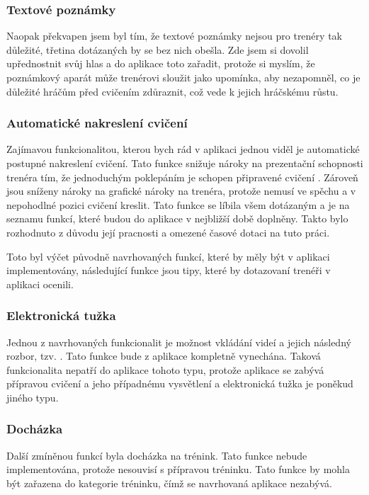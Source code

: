 \documentclass[thesis=B,czech]{FITthesis}[2012/06/26]
\begin{document}
\subsubsection{Textové poznámky}

	Naopak překvapen jsem byl tím, že textové poznámky nejsou pro trenéry tak důležité, třetina dotázaných by se bez nich obešla. Zde jsem si dovolil upřednostnit svůj hlas a do aplikace toto zařadit, protože si myslím, že poznámkový aparát může trenérovi sloužit jako upomínka, aby nezapomněl, co je důležité hráčům před cvičením zdůraznit, což vede k jejich hráčskému růstu.

\subsubsection{Automatické nakreslení cvičení}

	Zajímavou funkcionalitou, kterou bych rád v aplikaci jednou viděl je automatické postupné nakreslení cvičení. Tato funkce snižuje nároky na prezentační schopnosti trenéra tím, že jednoduchým poklepáním je schopen připravené cvičení . Zároveň jsou sníženy nároky na grafické nároky na trenéra, protože nemusí ve spěchu a v nepohodlné pozici cvičení kreslit. Tato funkce se líbila všem dotázaným a je na seznamu funkcí, které budou do aplikace v nejbližší době doplněny. Takto bylo rozhodnuto z důvodu její pracnosti a omezené časové dotaci na tuto práci.

	Toto byl výčet původně navrhovaných funkcí, které by měly být v aplikaci implementovány, následující funkce jsou tipy, které by dotazovaní trenéři v aplikaci ocenili.

\subsubsection{Elektronická tužka}

	Jednou z navrhovaných funkcionalit je možnost vkládání videí a jejich následný rozbor, tzv. . Tato funkce bude z aplikace kompletně vynechána. Taková funkcionalita nepatří do aplikace tohoto typu, protože aplikace se zabývá přípravou cvičení a jeho případnému vysvětlení a elektronická tužka je poněkud jiného typu.

\subsubsection{Docházka}

	Další zmíněnou funkcí byla docházka na trénink. Tato funkce nebude implementována, protože nesouvisí s přípravou tréninku. Tato funkce by mohla být zařazena do kategorie  tréninku, čímž se navrhovaná aplikace nezabývá.
\end{document}
